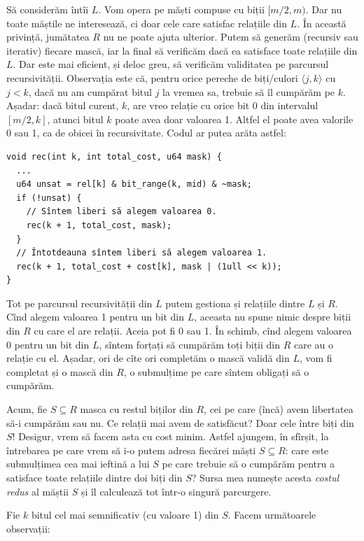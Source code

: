 \documentclass[../main.tex]{subfiles}
\begin{document}
Să considerăm întîi $L$. Vom opera pe măști compuse cu biții $[m/2, m)$. Dar nu toate măștile ne interesează, ci doar cele care satisfac relațiile din $L$. În această privință, jumătatea $R$ nu ne poate ajuta ulterior. Putem să generăm (recursiv sau iterativ) fiecare mască, iar la final să verificăm dacă ea satisface toate relațiile din $L$. Dar este mai eficient, și deloc greu, să verificăm validitatea pe parcursul recursivității. Observația este că, pentru orice pereche de biți/culori $\langle j, k \rangle$ cu $j < k$, dacă nu am cumpărat bitul $j$ la vremea sa, trebuie să îl cumpărăm pe $k$. Așadar: dacă bitul curent, $k$, are vreo relație cu orice bit 0 din intervalul $[m/2, k]$, atunci bitul $k$ poate avea doar valoarea 1. Altfel el poate avea valorile 0 sau 1, ca de obicei în recursivitate. Codul ar putea arăta astfel:

\begin{verbatim}
void rec(int k, int total_cost, u64 mask) {
  ...
  u64 unsat = rel[k] & bit_range(k, mid) & ~mask;
  if (!unsat) {
    // Sîntem liberi să alegem valoarea 0.
    rec(k + 1, total_cost, mask);
  }
  // Întotdeauna sîntem liberi să alegem valoarea 1.
  rec(k + 1, total_cost + cost[k], mask | (1ull << k));
}
\end{verbatim}

Tot pe parcursul recursivității din $L$ putem gestiona și relațiile dintre $L$ și $R$. Cînd alegem valoarea 1 pentru un bit din $L$, aceasta nu spune nimic despre biții din $R$ cu care el are relații. Aceia pot fi 0 sau 1. În schimb, cînd alegem valoarea 0 pentru un bit din $L$, sîntem forțați să cumpărăm toți biții din $R$ care au o relație cu el. Așadar, ori de cîte ori completăm o mască validă din $L$, vom fi completat și o mască din $R$, o submulțime pe care sîntem obligați să o cumpărăm.

Acum, fie $S \subseteq R$ masca cu restul biților din $R$, cei pe care (încă) avem libertatea să-i cumpărăm sau nu. Ce relații mai avem de satisfăcut? Doar cele între biți din $S$! Desigur, vrem să facem asta cu cost minim. Astfel  ajungem, în sfîrșit, la întrebarea pe care vrem să i-o putem adresa fiecărei măști $S \subseteq R$: care este submulțimea cea mai ieftină a lui $S$ pe care trebuie să o cumpărăm pentru a satisface toate relațiile dintre doi biți din $S$? Sursa mea numește acesta \textit{costul redus} al măștii $S$ și îl calculează tot într-o singură parcurgere.

Fie $k$ bitul cel mai semnificativ (cu valoare 1) din $S$. Facem următoarele observații:
\end{document}
